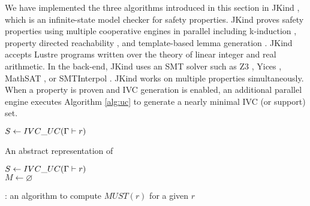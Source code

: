 We have implemented the three algorithms introduced in this section in JKind \cite{jkind}, which is an infinite-state model checker for safety properties. JKind proves safety properties using multiple cooperative engines in parallel including k-induction \cite{SheeranSS00}, property directed reachability \cite{Een2011:PDR}, and template-based lemma generation \cite{Kahsai2011}. JKind accepts
Lustre programs written over the theory of linear integer and real
arithmetic. In the back-end, JKind uses an SMT solver such as
Z3 \cite{DeMoura08:z3}, Yices \cite{Dutertre06:yices},
MathSAT \cite{Cimatti2013:MathSAT}, or SMTInterpol \cite{Christ2012:SMTInterpol}.
JKind works on multiple properties simultaneously. When a
property is proven and IVC generation is enabled, an additional
parallel engine executes Algorithm \ref{alg:uc} to generate a nearly minimal
IVC (or support) set.



\begin{algorithm}
  \BlankLine
  $S \leftarrow {IVC\_UC}(\Gamma \vdash r)$ \\
   {
  }
\caption{An abstract representation of \ucbfalg \cite{Ghass16}}
\label{alg:ucbf}
\end{algorithm}


\begin{algorithm}
  \BlankLine
  $S \leftarrow {IVC\_UC}(\Gamma \vdash r)$ \\
  $M \leftarrow \varnothing$ \\
   {
  }
\caption{\mustalg: an algorithm to compute $MUST(r)$ for a given $r$}
\label{alg:must}
\end{algorithm} 